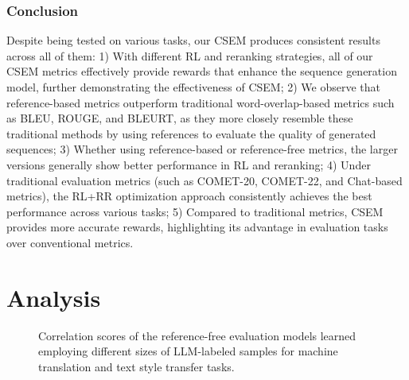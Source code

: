 \documentclass[lettersize,journal]{IEEEtran}
\begin{document}
\subsubsection{Conclusion}
Despite being tested on various tasks, our CSEM produces consistent results across all of them: 1) With different RL and reranking strategies, all of our CSEM metrics effectively provide rewards that enhance the sequence generation model, further demonstrating the effectiveness of CSEM; 2) We observe that reference-based metrics outperform traditional word-overlap-based metrics such as BLEU, ROUGE, and BLEURT, as they more closely resemble these traditional methods by using references to evaluate the quality of generated sequences; 3) Whether using reference-based or reference-free metrics, the larger versions generally show better performance in RL and reranking; 4) Under traditional evaluation metrics (such as COMET-20, COMET-22, and Chat-based metrics), the RL+RR optimization approach consistently achieves the best performance across various tasks; 5) Compared to traditional metrics, CSEM provides more accurate rewards, highlighting its advantage in evaluation tasks over conventional metrics.



\section{Analysis}
\begin{figure}[!t]
    \centering
    
    \vspace{-3mm}
    \caption{
     Correlation scores of the reference-free evaluation models learned employing different sizes of LLM-labeled samples for machine translation and text style transfer tasks.
    }
    \label{fig_diff_sample_size_transfer_summary}
\end{figure}
\end{document}
